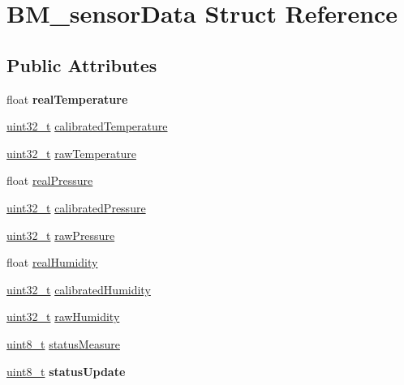 \hypertarget{structBM__sensorData}{}\section{B\+M\+\_\+sensor\+Data Struct Reference}
\label{structBM__sensorData}
\subsection*{Public Attributes}
\begin{DoxyCompactItemize}
\item 
\mbox{\label{structBM__sensorData_ab277f2f8b5738386bd951ac2fd30bd28}} 
float {\bfseries real\+Temperature}
\item 
\hyperlink{vl53l0x__types_8h_a435d1572bf3f880d55459d9805097f62}{uint32\+\_\+t} \hyperlink{structBM__sensorData_a3ab64fd19caf636950cb47ca2697cd6f}{calibrated\+Temperature}
\item 
\hyperlink{vl53l0x__types_8h_a435d1572bf3f880d55459d9805097f62}{uint32\+\_\+t} \hyperlink{structBM__sensorData_a59c55713af263f1533b9b2481f2af860}{raw\+Temperature}
\item 
float \hyperlink{structBM__sensorData_a616031c2e11814b054f9f43e7fce12fc}{real\+Pressure}
\item 
\hyperlink{vl53l0x__types_8h_a435d1572bf3f880d55459d9805097f62}{uint32\+\_\+t} \hyperlink{structBM__sensorData_ae28102363bbe4c8567103f3f7bc4799f}{calibrated\+Pressure}
\item 
\hyperlink{vl53l0x__types_8h_a435d1572bf3f880d55459d9805097f62}{uint32\+\_\+t} \hyperlink{structBM__sensorData_a1f2b1f5547b72be0682ea296ba63144c}{raw\+Pressure}
\item 
float \hyperlink{structBM__sensorData_ab1aac1511aef5fe07ecddf763329c038}{real\+Humidity}
\item 
\hyperlink{vl53l0x__types_8h_a435d1572bf3f880d55459d9805097f62}{uint32\+\_\+t} \hyperlink{structBM__sensorData_a0a220c8916aedd66c95e44548ec33e0f}{calibrated\+Humidity}
\item 
\hyperlink{vl53l0x__types_8h_a435d1572bf3f880d55459d9805097f62}{uint32\+\_\+t} \hyperlink{structBM__sensorData_a017dd76d7efffc01ecfe7d7bac5fdc7f}{raw\+Humidity}
\item 
\hyperlink{vl53l0x__types_8h_aba7bc1797add20fe3efdf37ced1182c5}{uint8\+\_\+t} \hyperlink{structBM__sensorData_ac415745c07825ddb08643ef66c2ec1a9}{status\+Measure}
\item 
\mbox{\label{structBM__sensorData_abe0b6e503d1458e83510a6dba728137e}} 
\hyperlink{vl53l0x__types_8h_aba7bc1797add20fe3efdf37ced1182c5}{uint8\+\_\+t} {\bfseries status\+Update}
\end{DoxyCompactItemize}


